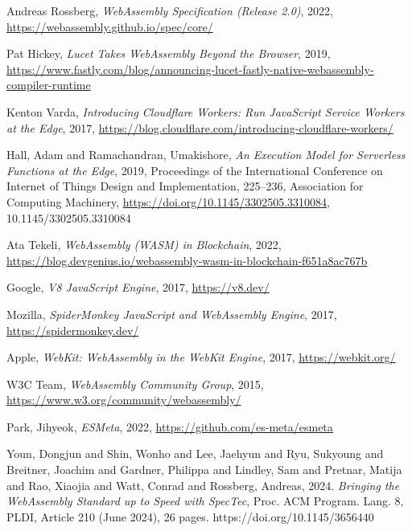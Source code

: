 \begin{thebibliography}{00}

 Andreas Rossberg, \textit{WebAssembly Specification (Release 2.0)}, 2022, \url{https://webassembly.github.io/spec/core/}

 Pat Hickey, \textit{Lucet Takes WebAssembly Beyond the Browser}, 2019, \url{https://www.fastly.com/blog/announcing-lucet-fastly-native-webassembly-compiler-runtime}

 Kenton Varda, \textit{Introducing Cloudflare Workers: Run JavaScript Service Workers at the Edge}, 2017, \url{https://blog.cloudflare.com/introducing-cloudflare-workers/}

 Hall, Adam and Ramachandran, Umakishore, \textit{An Execution Model for Serverless Functions at the Edge}, 2019,
 Proceedings of the International Conference on Internet of Things Design and Implementation, 225–236, Association for Computing Machinery, \url{https://doi.org/10.1145/3302505.3310084}, 10.1145/3302505.3310084

 Ata Tekeli, \textit{WebAssembly (WASM) in Blockchain}, 2022, \url{https://blog.devgenius.io/webassembly-wasm-in-blockchain-f651a8ac767b}

 Google, \textit{V8 JavaScript Engine}, 2017, \url{https://v8.dev/}

 Mozilla, \textit{SpiderMonkey JavaScript and WebAssembly Engine}, 2017, \url{https://spidermonkey.dev/}

 Apple, \textit{WebKit: WebAssembly in the WebKit Engine}, 2017, \url{https://webkit.org/}

 W3C Team, \textit{WebAssembly Community Group}, 2015, \url{https://www.w3.org/community/webassembly/}

 Park, Jihyeok, \textit{ESMeta}, 2022, \url{https://github.com/es-meta/esmeta}

 Youn, Dongjun and Shin, Wonho and Lee, Jaehyun  and Ryu, Sukyoung and Breitner, Joachim and Gardner, Philippa and Lindley, Sam and Pretnar, Matija and Rao, Xiaojia and Watt, Conrad and Rossberg, Andreas, 2024. \textit{Bringing the WebAssembly Standard up to Speed with SpecTec}, Proc. ACM Program. Lang. 8, PLDI, Article 210 (June 2024), 26 pages. https://doi.org/10.1145/3656440


\end{thebibliography}
